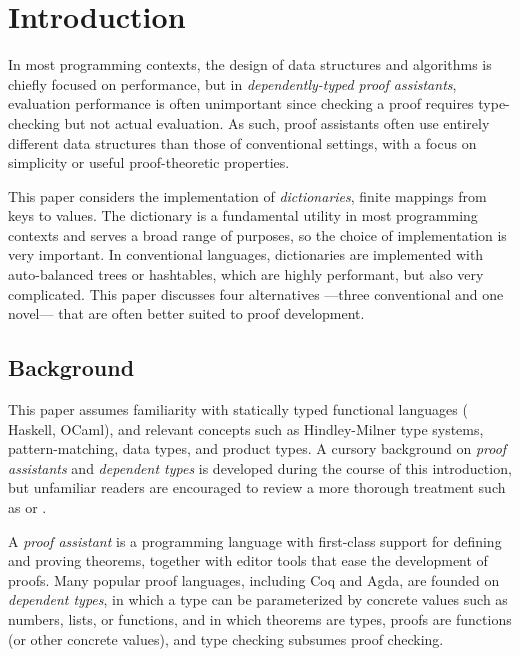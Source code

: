 \section{Introduction}
\label{sec:Introduction}

\newcommand{\firstUseGoal}[1]
  {\textbf{\emph{#1}}}


In most programming contexts, the design of data structures and algorithms is chiefly focused on performance, but in \emph{dependently-typed proof assistants}, evaluation performance is often unimportant since checking a proof requires type-checking but not actual evaluation.
%
As such, proof assistants often use entirely different data structures than those of conventional settings, with a focus on simplicity or useful proof-theoretic properties.

This paper considers the implementation of \emph{dictionaries}, \ie{} finite mappings from keys to values.
%
The dictionary is a fundamental utility in most programming contexts and serves a broad range of purposes, so the choice of implementation is very important.
%
In conventional languages, dictionaries are implemented with auto-balanced trees or hashtables, which are highly performant, but also very complicated.
%
This paper discusses four alternatives ---three conventional and one novel--- that are often better suited to proof development.

\subsection{Background}

This paper assumes familiarity with statically typed functional languages (\eg{} Haskell, OCaml), and relevant concepts such as Hindley-Milner type systems, pattern-matching, data types, and product types.
%
A cursory background on \emph{proof assistants} and \emph{dependent types} is developed during the course of this introduction, but unfamiliar readers are encouraged to review a more thorough treatment such as \citep{plfa} or \citep{Pierce:SF1}.

A \emph{proof assistant} is a programming language with first-class support for defining and proving theorems, together with editor tools that ease the development of proofs.
%
Many popular proof languages, including Coq and Agda, are founded on \emph{dependent types}, in which a type can be parameterized by concrete values such as numbers, lists, or functions,
%
and in which theorems are types, proofs are functions (or other concrete values), and type checking subsumes proof checking.

